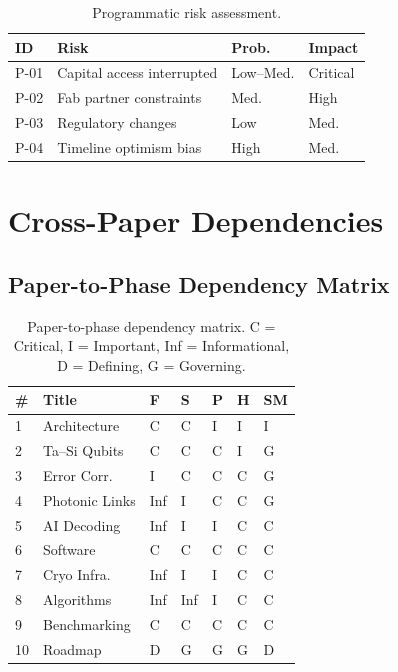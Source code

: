 \documentclass[conference]{IEEEtran}
\begin{document}
\begin{table}[H]
\centering
\caption{Programmatic risk assessment.}
\label{tab:prog_risk}
\begin{tabular}{@{}l L{3cm} l l@{}}
\toprule
\textbf{ID} & \textbf{Risk} & \textbf{Prob.} & \textbf{Impact} \\
\midrule
P-01 & Capital access interrupted & Low--Med. & Critical \\
P-02 & Fab partner constraints & Med. & High \\
P-03 & Regulatory changes & Low & Med. \\
P-04 & Timeline optimism bias & High & Med. \\
\bottomrule
\end{tabular}
\end{table}

\section{Cross-Paper Dependencies}

\subsection{Paper-to-Phase Dependency Matrix}

\begin{table}[H]
\centering
\caption{Paper-to-phase dependency matrix. C = Critical, I = Important, Inf = Informational, D = Defining, G = Governing.}
\label{tab:dependencies}
\begin{tabular}{@{}l l l l l l l@{}}
\toprule
\textbf{\#} & \textbf{Title} & \textbf{F} & \textbf{S} & \textbf{P} & \textbf{H} & \textbf{SM} \\
\midrule
1 & Architecture & C & C & I & I & I \\
2 & Ta--Si Qubits & C & C & C & I & G \\
3 & Error Corr. & I & C & C & C & G \\
4 & Photonic Links & Inf & I & C & C & G \\
5 & AI Decoding & Inf & I & I & C & C \\
6 & Software & C & C & C & C & C \\
7 & Cryo Infra. & Inf & I & I & C & C \\
8 & Algorithms & Inf & Inf & I & C & C \\
9 & Benchmarking & C & C & C & C & C \\
10 & Roadmap & D & G & G & G & D \\
\bottomrule
\end{tabular}
\end{table}
\end{document}
